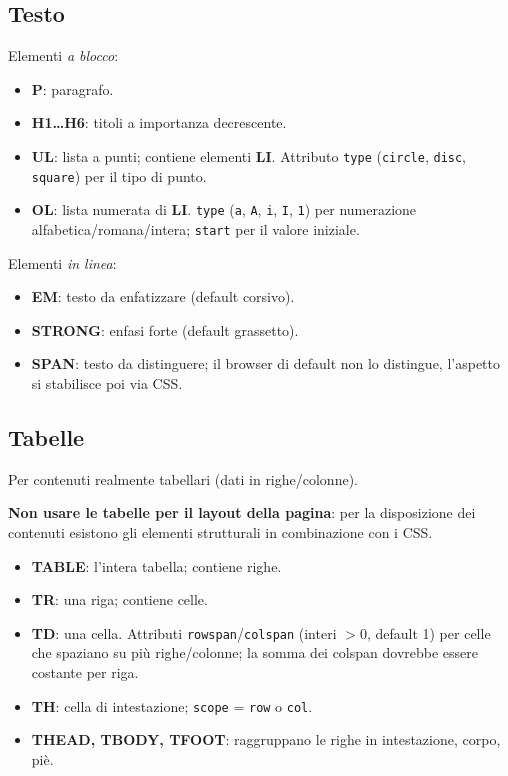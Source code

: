 \subsection{Testo}
Elementi \emph{a blocco}:
\begin{itemize}
  \item \textbf{P}: paragrafo.
  \item \textbf{H1\dots H6}: titoli a importanza decrescente.
  \item \textbf{UL}: lista a punti; contiene elementi \textbf{LI}. Attributo \texttt{type}
        (\texttt{circle}, \texttt{disc}, \texttt{square}) per il tipo di punto.
  \item \textbf{OL}: lista numerata di \textbf{LI}. \texttt{type} (\texttt{a}, \texttt{A},
        \texttt{i}, \texttt{I}, \texttt{1}) per numerazione alfabetica/romana/intera;
        \texttt{start} per il valore iniziale.
\end{itemize}
Elementi \emph{in linea}:
\begin{itemize}
  \item \textbf{EM}: testo da enfatizzare (default corsivo).
  \item \textbf{STRONG}: enfasi forte (default grassetto).
  \item \textbf{SPAN}: testo da distinguere; il browser di default non lo distingue,
        l'aspetto si stabilisce poi via CSS.
\end{itemize}

\subsection{Tabelle}
Per contenuti realmente tabellari (dati in righe/colonne).
\begin{attenzione}
\textbf{Non usare le tabelle per il layout della pagina}: per la disposizione dei contenuti
esistono gli elementi strutturali in combinazione con i CSS.
\end{attenzione}
\begin{itemize}
  \item \textbf{TABLE}: l'intera tabella; contiene righe.
  \item \textbf{TR}: una riga; contiene celle.
  \item \textbf{TD}: una cella. Attributi \texttt{rowspan}/\texttt{colspan} (interi $>0$,
        default 1) per celle che spaziano su pi\`u righe/colonne; la somma dei colspan
        dovrebbe essere costante per riga.
  \item \textbf{TH}: cella di intestazione; \texttt{scope} = \texttt{row} o \texttt{col}.
  \item \textbf{THEAD, TBODY, TFOOT}: raggruppano le righe in intestazione, corpo, pi\`e.
\end{itemize}

